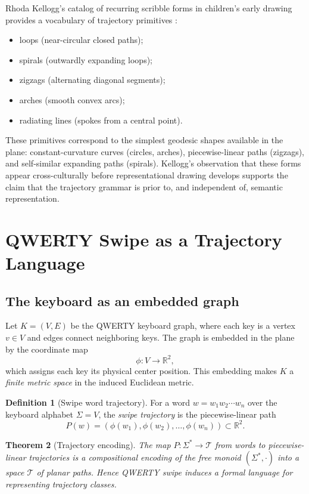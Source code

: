 \documentclass[12pt,a4paper]{article}
\theoremstyle{plain}
\newtheorem{theorem}{Theorem}[section]
\theoremstyle{definition}
\newtheorem{definition}[theorem]{Definition}
\begin{document}
Rhoda Kellogg's catalog of recurring scribble forms in children's early drawing
provides a vocabulary of trajectory primitives \cite{kellogg1969}:
\begin{itemize}[nosep]
\item loops (near-circular closed paths);
\item spirals (outwardly expanding loops);
\item zigzags (alternating diagonal segments);
\item arches (smooth convex arcs);
\item radiating lines (spokes from a central point).
\end{itemize}
These primitives correspond to the simplest geodesic shapes available in the
plane: constant-curvature curves (circles, arches), piecewise-linear paths
(zigzags), and self-similar expanding paths (spirals). Kellogg's observation
that these forms appear cross-culturally before representational drawing
develops supports the claim that the trajectory grammar is prior to, and
independent of, semantic representation.

\section{QWERTY Swipe as a Trajectory Language}
\label{sec:swipe}

\subsection{The keyboard as an embedded graph}

Let $K = (V,E)$ be the QWERTY keyboard graph, where each key is a vertex
$v \in V$ and edges connect neighboring keys. The graph is embedded in the
plane by the coordinate map
\[
\phi: V \to \mathbb{R}^2,
\]
which assigns each key its physical center position. This embedding makes $K$ a
\emph{finite metric space} in the induced Euclidean metric.

\begin{definition}[Swipe word trajectory]
For a word $w = w_1 w_2 \cdots w_n$ over the keyboard alphabet $\Sigma = V$,
the \emph{swipe trajectory} is the piecewise-linear path
\[
P(w) = (\phi(w_1), \phi(w_2), \dots, \phi(w_n)) \subset \mathbb{R}^2.
\]
\end{definition}

\begin{theorem}[Trajectory encoding]
The map $P:\Sigma^*\to\mathcal{T}$ from words to piecewise-linear trajectories
is a compositional encoding of the free monoid $(\Sigma^*,\cdot)$ into a space
$\mathcal{T}$ of planar paths. Hence QWERTY swipe induces a formal language for
representing trajectory classes.
\end{theorem}
\end{document}
